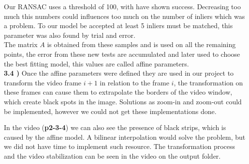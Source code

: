 \documentclass[12pt,a4paper]{article}
\begin{document}
Our RANSAC uses a threshold of 100, with have shown success. Decreasing too much this numbers could influences too much on the number of inliers which was a problem. To our model be accepted at least 5 inliers must be matched, this parameter was also found by trial and error. \\ 

The matrix $A$ is obtained from these samples and is used on all the remaining points, the error from these new tests are accumulated and later used to choose the best fitting model, this values are called affine parameters.\\


\textbf{3.4 )} Once the affine parameters were defined they are used in our project to transform the video frame $i + 1$ in relation to the frame $i$, the transformation on these frames can cause them to extrapolate the borders of the video window, which create black spots in the image. Solutions as zoom-in and zoom-out could be implemented, however we could not get these implementations done.

In the video (\textbf{p2-3-4}) we can also see the presence of black strips, which is caused by the affine model. A bilinear interpolation would solve the problem, but we did not have time to implement such resource. The transformation process and the video stabilization can be seen in the video on the output folder.
\end{document}
